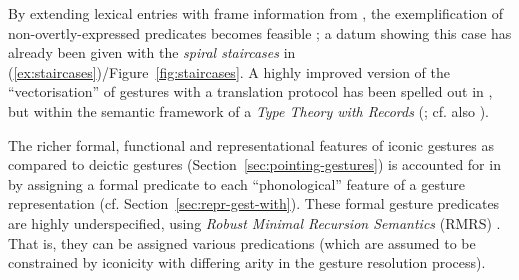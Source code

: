\documentclass[output=paper
 	        ,biblatex
                ,babelshorthands
                ,newtxmath
                ,draftmode
                ,colorlinks, citecolor=brown
]{langscibook}
\begin{document}
\ea \label{ex:half-circle}
\z

By extending lexical entries with frame information from  \citep{Fillmore82a-u}, the exemplification of non-overtly-expressed predicates becomes feasible \citep[Section~9.2.1]{Luecking:2013:a}; a datum showing this case has already been given with the \emph{spiral staircases} in (\ref{ex:staircases})/Figure~\ref{fig:staircases}.
%
A highly improved version of the \enquote{vectorisation} of gestures with a translation protocol has been spelled out in \citet{Luecking:2016}, but within the semantic framework of a \emph{Type Theory with Records} (\citealt{Cooper:ms,Cooper:Ginzburg:2015}; cf. also ).



The richer formal, functional and representational features of iconic gestures as compared to deictic gestures (Section~\ref{sec:pointing-gestures}) is accounted for in \citet{Alahverdzhieva:Lascarides:Flickinger:2017} by assigning a formal predicate to each \enquote{phonological} feature of a gesture representation (cf. Section~\ref{sec:repr-gest-with}). 
%
These formal gesture predicates are highly underspecified, using \textit{Robust Minimal Recursion Semantics} (RMRS) \citep{Copestake:2007}.
%
That is, they can be assigned various predications (which are assumed to be constrained by iconicity with differing arity in the gesture resolution process).
\end{document}
